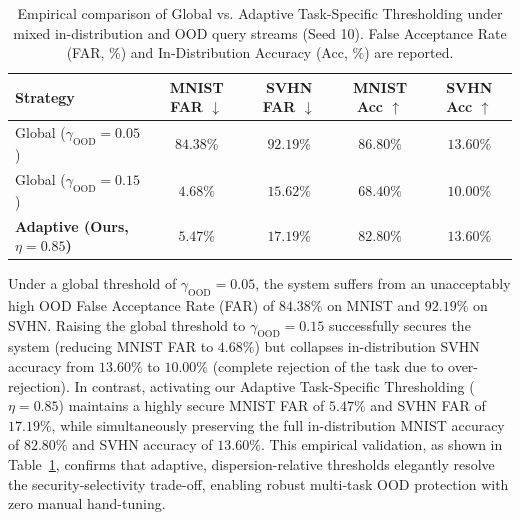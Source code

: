 \begin{table}[h]
\caption{Empirical comparison of Global vs. Adaptive Task-Specific Thresholding under mixed in-distribution and OOD query streams (Seed 10). False Acceptance Rate (FAR, \%) and In-Distribution Accuracy (Acc, \%) are reported.}
\label{tab:adaptive_ood}
\vskip 0.15in
\begin{center}
\begin{scriptsize}
\begin{sc}
\setlength{\tabcolsep}{2pt}
\begin{tabular}{lcccc}
\toprule
Strategy & \shortstack{MNIST\\FAR $\downarrow$} & \shortstack{SVHN\\FAR $\downarrow$} & \shortstack{MNIST\\Acc $\uparrow$} & \shortstack{SVHN\\Acc $\uparrow$} \\
\midrule
Global ($\gamma_{\text{OOD}} = 0.05$) & $84.38\%$ & $92.19\%$ & $86.80\%$ & $13.60\%$ \\
Global ($\gamma_{\text{OOD}} = 0.15$) & $4.68\%$ & $15.62\%$ & $68.40\%$ & $10.00\%$ \\
\midrule
\textbf{Adaptive (Ours, $\eta=0.85$)} & $\mathbf{5.47\%}$ & $\mathbf{17.19\%}$ & $\mathbf{82.80\%}$ & $\mathbf{13.60\%}$ \\
\bottomrule
\end{tabular}
\end{sc}
\end{scriptsize}
\end{center}
\vskip -0.1in
\end{table}

Under a global threshold of $\gamma_{\text{OOD}} = 0.05$, the system suffers from an unacceptably high OOD False Acceptance Rate (FAR) of $84.38\%$ on MNIST and $92.19\%$ on SVHN. Raising the global threshold to $\gamma_{\text{OOD}} = 0.15$ successfully secures the system (reducing MNIST FAR to $4.68\%$) but collapses in-distribution SVHN accuracy from $13.60\%$ to $10.00\%$ (complete rejection of the task due to over-rejection). In contrast, activating our Adaptive Task-Specific Thresholding ($\eta = 0.85$) maintains a highly secure MNIST FAR of $5.47\%$ and SVHN FAR of $17.19\%$, while simultaneously preserving the full in-distribution MNIST accuracy of $82.80\%$ and SVHN accuracy of $13.60\%$. This empirical validation, as shown in Table~\ref{tab:adaptive_ood}, confirms that adaptive, dispersion-relative thresholds elegantly resolve the security-selectivity trade-off, enabling robust multi-task OOD protection with zero manual hand-tuning.

